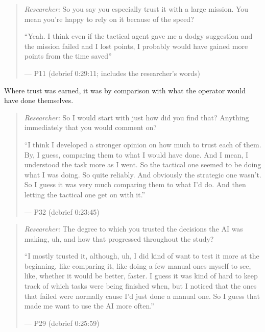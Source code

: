 \begin{quote}\small
{\footnotesize\textit{Researcher:} So you say you especially trust it with a large mission. You mean you're happy to rely on it because of the speed?}\par\smallskip
``Yeah. I think even if the tactical agent gave me a dodgy suggestion and the mission failed and I lost points, I probably would have gained more points from the time saved''\par\hfill--- P11 (debrief 0:29:11; includes the researcher's words)
\end{quote}


\label{sec:qual:trust-unchecked:earned}
Where trust was earned, it was by comparison with what the operator would have done themselves.

\begin{quote}\small
{\footnotesize\textit{Researcher:} So I would start with just how did you find that? Anything immediately that you would comment on?}\par\smallskip
``I think I developed a stronger opinion on how much to trust each of them. By, I guess, comparing them to what I would have done. And I mean, I understood the task more as I went. So the tactical one seemed to be doing what I was doing. So quite reliably. And obviously the strategic one wasn't. So I guess it was very much comparing them to what I'd do. And then letting the tactical one get on with it.''\par\hfill--- P32 (debrief 0:23:45)
\end{quote}

\begin{quote}\small
{\footnotesize\textit{Researcher:} The degree to which you trusted the decisions the AI was making, uh, and how that progressed throughout the study?}\par\smallskip
``I mostly trusted it, although, uh, I did kind of want to test it more at the beginning, like comparing it, like doing a few manual ones myself to see, like, whether it would be better, faster. I guess it was kind of hard to keep track of which tasks were being finished when, but I noticed that the ones that failed were normally cause I'd just done a manual one. So I guess that made me want to use the AI more often.''\par\hfill--- P29 (debrief 0:25:59)
\end{quote}

